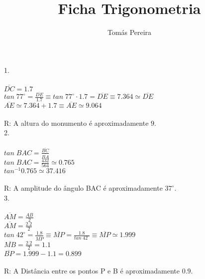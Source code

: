 \documentclass[12pt]{article}
\title{Ficha Trigonometria}
\author{Tomás Pereira}
\begin{document}
\maketitle

1.\\\\
$\overline{DC}=1.7$\\
$tan\;77^{\circ}=\frac{\overline{DE}}{1.7}\equiv tan\;77^{\circ}\cdot1.7=\overline{DE}\equiv7.364\simeq\overline{DE}$\\
$\overline{AE}\simeq7.364+1.7\equiv\overline{AE}\simeq9.064$\\\\
R: A altura do monumento é aproximadamente $9$.\\

2.\\\\
$tan\;BAC=\frac{\overline{BC}}{\overline{BA}}$\\
$tan\;BAC=\frac{432}{564}\simeq0.765$\\
$tan^{-1}0.765\simeq37.416$\\\\
R: A amplitude do ângulo BAC é aproximadamente $37^{\circ}$.\\

3.\\\\
$\overline{AM}=\frac{AB}{2}$\\
$\overline{AM}=\frac{2.2}{2}$\\
$tan\;42^{\circ}=\frac{1.8}{\overline{MP}}\equiv\overline{MP}=\frac{1.8}{tan\;42^{\circ}}\equiv\overline{MP}\simeq1.999$\\
$\overline{MB}=\frac{2.2}{2}=1.1$\\
$\overline{BP}=1.999-1.1=0.899$\\\\
R: A Distância entre os pontos P e B é aproximadamente $0.9$.\\
\end{document}
